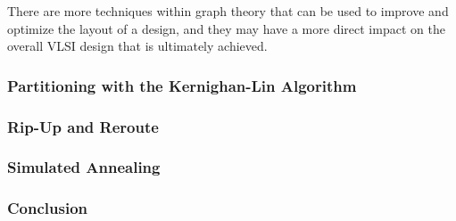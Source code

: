 \documentclass[12pt]{article}
\begin{document}
\begin{flushleft}
There are more techniques within graph theory that can
be used to improve and optimize the layout of a design,
and they may have a more direct impact on the overall
VLSI design that is ultimately achieved. 

\subsubsection*{Partitioning with the Kernighan-Lin Algorithm}


\subsubsection*{Rip-Up and Reroute}


\subsubsection*{Simulated Annealing}


\subsubsection*{Conclusion}



\newpage

\printbibliography

\end{flushleft}
\end{document}

